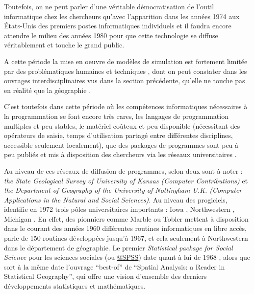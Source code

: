 Toutefois, on ne peut parler d'une véritable démocratisation de l'outil informatique chez les chercheurs qu'avec l'apparition dans les années 1974 aux États-Unis des premiers postes informatiques individuels \autocite[221]{Ceruzzi2000} et il faudra encore attendre le milieu des années 1980 pour que cette technologie se diffuse véritablement et touche le grand public.

A cette période la mise en oeuvre de modèles de simulation est fortement limitée par des problématiques humaines et techniques \autocites{Haggett1969}[387]{Marble1972}, dont on peut constater dans les ouvrages interdisciplinaires vus dans la section précédente, qu'elle ne touche pas en réalité que la géographie \autocite{Guetzkow1972}.

C'est toutefois dans cette période où les compétences informatiques nécessaires à la programmation se font encore très rares, les langages de programmation multiples et peu stables, le matériel coûteux et peu disponible (nécessitant des opérateurs de saisie, temps d'utilisation partagé entre différentes disciplines, accessible seulement localement), que des packages de programmes sont peu à peu publiés et mis à disposition des chercheurs via les réseaux universitaires \autocite{Haggett1969}. 

Au niveau de ces réseaux de diffusion de programmes, selon \textcite[20-21]{Greer1972} deux sont à noter : \textit{the State Geological Survey of University of Kansas (Computer Contributions)}  et \textit{ the Department of Geography of the University of Nottingham U.K. (Computer Applications in the Natural and Social Sciences)}. Au niveau des progiciels, \textcite[20-21]{Greer1972} identifie en 1972 trois pôles universitaires importants : Iowa \autocite{Wittick1968}, Northwestern \autocites{Marble1967, Marble1972b, Marble1972,Marble2010}, Michigan \autocite{Tobler1970c} . En effet, des pionniers comme Marble ou Tobler mettent à disposition dans le courant des années 1960 différentes routines informatiques en libre accès, \textcites[3]{Marble1967, Pitts1968} parle de 150 routines développées jusqu'à 1967, et cela seulement à Northwestern dans le département de géographie. Le premier \textit{Statistical package for Social Science} pour les sciences sociales (ou \href{http://www.spss.com.hk/corpinfo/history.htm}{@SPSS}) date quant à lui de 1968 \autocite{Barnes2011}, alors que sort à la même date l'ouvrage \foreignquote{english}{best-of} de \textcite{Berry1968} \foreignquote{english}{Spatial Analysis: a Reader in Statistical Geography}, qui offre une vision d'ensemble des derniers développements statistiques et mathématiques.

